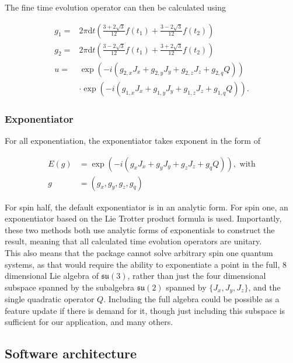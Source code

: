 \documentclass{jors}
\begin{document}
			The fine time evolution operator can then be calculated using
			
			\begin{align*}
				g_1 =& 2 \pi \mathrm{d}t \left(\frac{3 + 2 \sqrt{3}}{12} f(t_1) + \frac{3 - 2 \sqrt{3}}{12} f(t_2)\right)\\
				g_2 =& 2 \pi \mathrm{d}t \left(\frac{3 - 2 \sqrt{3}}{12} f(t_1) + \frac{3 + 2 \sqrt{3}}{12} f(t_2)\right)\\
				u =& \exp(-i \left( g_{2,x} J_x + g_{2,y} J_y + g_{2,z} J_z + g_{2,q} Q\right))\\
				&\cdot\exp(-i \left( g_{1,x} J_x + g_{1,y} J_y + g_{1,z} J_z + g_{1,q} Q\right)).
			\end{align*}

		\subsubsection*{Exponentiator}
			For all exponentiation, the exponentiator takes exponent in the form of
			
			\begin{align*}
				E(g) &= \exp(-i (g_x J_x + g_y J_y + g_z J_z + g_q Q)), \textrm{ with}\\
				g &= (g_x, g_y, g_z, g_q)
			\end{align*}
			
			For spin half, the default exponentiator is in an analytic form. For spin one, an exponentiator based on the Lie Trotter product formula \cite{moler_nineteen_2003} is used. Importantly, these two methods both use analytic forms of exponentials to construct the result, meaning that all calculated time evolution operators are unitary.\\

			This also means that the package cannot solve arbitrary spin one quantum systems, as that would require the ability to exponentiate a point in the full, 8 dimensional Lie algebra of \(\mathfrak{su}(3)\), rather than just the four dimensional subspace spanned by the subalgebra \(\mathfrak{su}(2)\) spanned by \(\{J_x, J_y, J_z\}\), and the single quadratic operator \(Q\). Including the full algebra could be possible as a feature update if there is demand for it, though just including this subspace is sufficient for our application, and many others.

	\subsection*{Software architecture}
\end{document}
